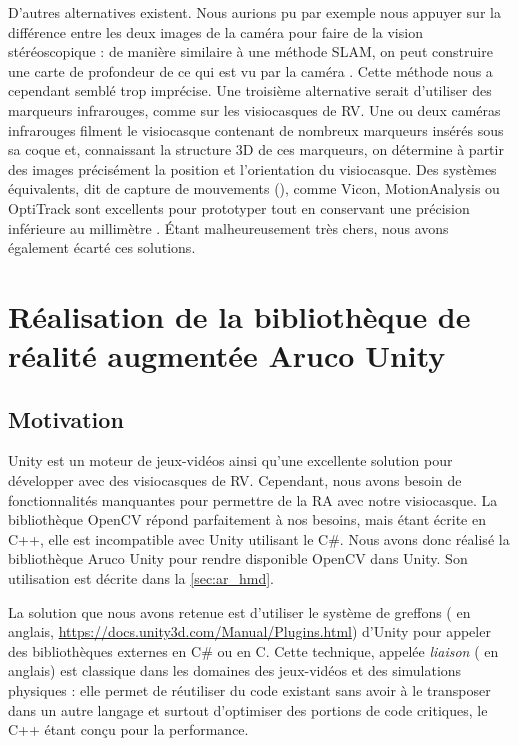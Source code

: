 
D'autres alternatives existent. Nous aurions pu par exemple nous appuyer sur la différence entre les deux images de la caméra pour faire de la vision stéréoscopique : de manière similaire à une méthode SLAM, on peut construire une carte de profondeur de ce qui est vu par la caméra . Cette méthode nous a cependant semblé trop imprécise. Une troisième alternative serait d'utiliser des marqueurs infrarouges, comme sur les visiocasques de RV. Une ou deux caméras infrarouges filment le visiocasque contenant de nombreux marqueurs insérés sous sa coque  et, connaissant la structure 3D de ces marqueurs, on détermine à partir des images précisément la position et l'orientation du visiocasque. Des systèmes équivalents, dit de capture de mouvements (), comme Vicon, MotionAnalysis ou OptiTrack sont excellents pour prototyper tout en conservant une précision inférieure au millimètre . Étant malheureusement très chers, nous avons également écarté ces solutions.


\section{Réalisation de la bibliothèque de réalité augmentée Aruco Unity}
\label{sec:aruco_unity}

\subsection{Motivation}
\label{subsec:aruco_unity_motivation}
Unity est un moteur de jeux-vidéos ainsi qu'une excellente solution pour développer avec des visiocasques de RV. Cependant, nous avons besoin de fonctionnalités manquantes pour permettre de la RA avec notre visiocasque. La bibliothèque OpenCV répond parfaitement à nos besoins, mais étant écrite en C++, elle est incompatible avec Unity utilisant le C\#. Nous avons donc réalisé la bibliothèque Aruco Unity pour rendre disponible OpenCV dans Unity. Son utilisation est décrite dans la \autoref{sec:ar_hmd}.

La solution que nous avons retenue est d'utiliser le système de greffons ( en anglais, \url{https://docs.unity3d.com/Manual/Plugins.html}) d'Unity pour appeler des bibliothèques externes en C\# ou en C. Cette technique, appelée \emph{liaison} ( en anglais) est classique dans les domaines des jeux-vidéos et des simulations physiques : elle permet de réutiliser du code existant sans avoir à le transposer dans un autre langage et surtout d'optimiser des portions de code critiques, le C++ étant conçu pour la performance.

